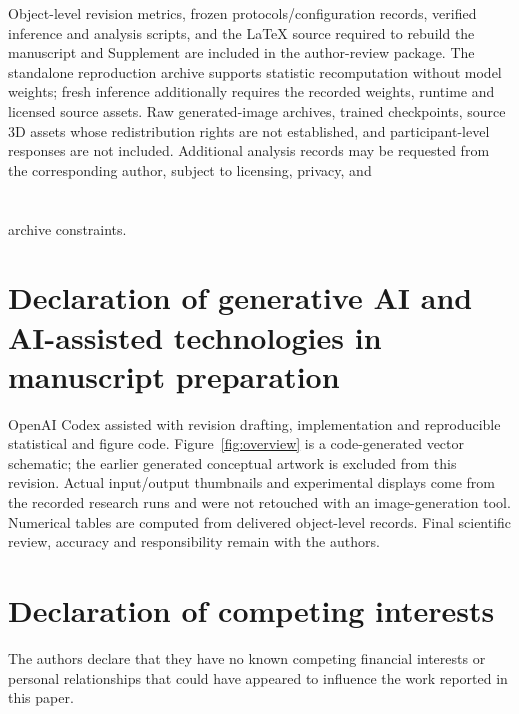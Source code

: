 \documentclass[times,twocolumn,final]{elsarticle}
\providecommand{\DIFadd}[1]{{\protect\color{blue} \sf #1}} %
\providecommand{\DIFaddbegin}{} %
\providecommand{\DIFaddend}{} %
\begin{document}
  \DIFaddbegin \DIFadd{Object-level revision metrics, frozen protocols/configuration records, verified inference and analysis scripts, and the LaTeX source required to rebuild the manuscript and Supplement are included in the author-review package. The standalone reproduction archive supports statistic recomputation without model weights; fresh inference additionally requires the recorded weights, runtime and licensed source assets. Raw generated-image archives, trained checkpoints, source 3D assets whose redistribution rights are not established, and participant-level responses are not included. Additional analysis records may be requested from the corresponding author, subject to licensing, privacy, }\DIFaddend and  

\section*{}
 \DIFaddbegin \DIFadd{archive constraints.
}\DIFaddend 

  \DIFaddbegin \section*{\DIFadd{Declaration of generative AI and AI-assisted technologies in manuscript preparation}}
\DIFadd{OpenAI Codex assisted with revision drafting, implementation and reproducible statistical and figure code. Figure~\ref{fig:overview} is a code-generated vector schematic; the earlier generated conceptual artwork is excluded from this revision. Actual input/output thumbnails and experimental displays come from the recorded research runs and were not retouched with an image-generation tool. Numerical tables are computed from delivered object-level records. Final scientific review, accuracy and responsibility remain with the authors}\DIFaddend .

\section*{Declaration of competing interests}

The authors declare that they have no known competing financial interests or personal relationships that could have appeared to influence the work reported in this paper.
\end{document}
